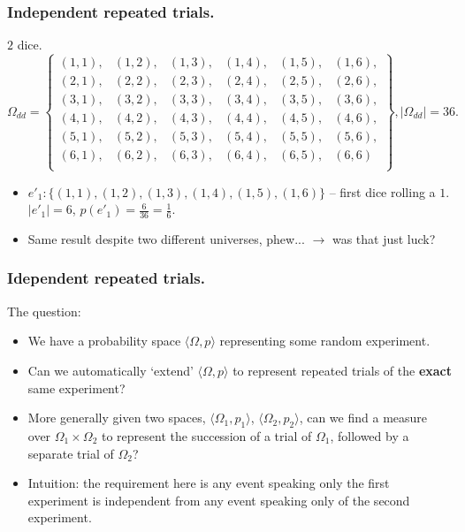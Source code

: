 \documentclass{beamer}
\begin{document}
\begin{frame}
  \frametitle{Independent repeated trials.}
   \begin{exampleblock}{$2$ dice.}
    \[ \Omega_{dd} = \left\{ \begin{array}{llllll}
      (1, 1), &(1, 2), &(1, 3), &(1, 4), &(1, 5), &(1, 6),\\
      (2, 1), &(2, 2), &(2, 3), &(2, 4), &(2, 5), &(2, 6),\\
      (3, 1), &(3, 2), &(3, 3), &(3, 4), &(3, 5), &(3, 6),\\
      (4, 1), &(4, 2), &(4, 3), &(4, 4), &(4, 5), &(4, 6),\\
      (5, 1), &(5, 2), &(5, 3), &(5, 4), &(5, 5), &(5, 6),\\
      (6, 1), &(6, 2), &(6, 3), &(6, 4), &(6, 5), &(6, 6)\\
      \end{array}
    \right \}, |\Omega_{dd}| = 36.\]
    \begin{itemize}
    \item $e'_1: \{ (1, 1), (1, 2), (1, 3), (1, 4), (1, 5), (1, 6)\}$ -- first dice rolling a $1$. $|e'_1| = 6$, $p(e'_1) = \frac{6}{36} = \frac{1}{6}$.
    \item Same result despite two different universes, phew... \alert{$\rightarrow$ was that just luck?}
    \end{itemize}
   \end{exampleblock}  
\end{frame}

\begin{frame}
  \frametitle{Idependent repeated trials.}
  \begin{block}{The question:}
    \begin{itemize}
    \item We have a probability space $\langle \Omega, p \rangle$ representing some random experiment.
    \item Can we automatically `extend' $\langle \Omega, p \rangle$ to represent repeated trials of the \textbf{exact} same experiment?
    \item More generally given two spaces, $\langle \Omega_1, p_1 \rangle$, $\langle \Omega_2, p_2 \rangle$, can we find a measure over $\Omega_1 \times \Omega_2$ to represent the succession of a trial of $\Omega_1$, followed by a separate trial of $\Omega_2$?
    \item Intuition: the requirement here is any event speaking only the first experiment is independent from any event speaking only of the second experiment.
    \end{itemize}
  \end{block}
\end{frame}
\end{document}
